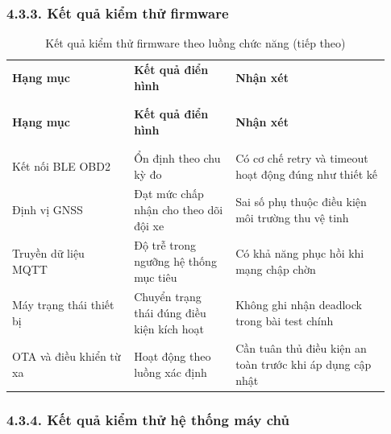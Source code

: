 \documentclass[a4paper]{extarticle}
\newcommand{\thesissettableid}[2]{%
  \renewcommand{\thetable}{#1}%
  \renewcommand{\theHtable}{#2}%
}
\begin{document}
\subsubsection{4.3.3. Kết quả kiểm thử firmware}

{\thesissettableid{4.4}{tab-condensed-ch4-firmware-results}
\def\LTcaptype{table}
\begin{longtable}{|L{0.300\linewidth}|L{0.250\linewidth}|L{0.380\linewidth}|}
\caption{Kết quả kiểm thử firmware theo luồng chức năng}\label{tab:condensed-ch4-firmware-results}\\
\hline \textbf{Hạng mục} & \textbf{Kết quả điển hình} & \textbf{Nhận xét} \\
\\\hline
\endfirsthead
\caption[]{Kết quả kiểm thử firmware theo luồng chức năng (tiếp theo)}\\
\hline \textbf{Hạng mục} & \textbf{Kết quả điển hình} & \textbf{Nhận xét} \\
\\\hline
\endhead
\\\hline
\endfoot
\endlastfoot
Kết nối BLE OBD2 & Ổn định theo chu kỳ đo & Có cơ chế retry và timeout hoạt động đúng như thiết kế \\\hline
Định vị GNSS & Đạt mức chấp nhận cho theo dõi đội xe & Sai số phụ thuộc điều kiện môi trường thu vệ tinh \\\hline
Truyền dữ liệu MQTT & Độ trễ trong ngưỡng hệ thống mục tiêu & Có khả năng phục hồi khi mạng chập chờn \\\hline
Máy trạng thái thiết bị & Chuyển trạng thái đúng điều kiện kích hoạt & Không ghi nhận deadlock trong bài test chính \\\hline
OTA và điều khiển từ xa & Hoạt động theo luồng xác định & Cần tuân thủ điều kiện an toàn trước khi áp dụng cập nhật \\\hline
\end{longtable}
}

\subsubsection{4.3.4. Kết quả kiểm thử hệ thống máy chủ}
\end{document}
